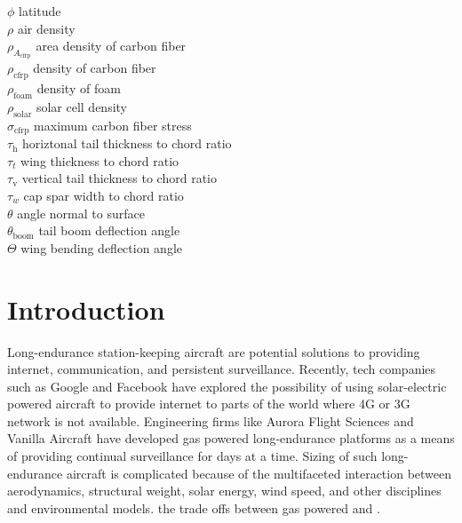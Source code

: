\begin{multicols}{2}
\begin{tabbing}
$\phi$ \> latitude \\
$\rho$ \> air density \\ %
$\rho_{A_{\text{cfrp}}}$ \> area density of carbon fiber \\ %
$\rho_{\text{cfrp}}$ \> density of carbon fiber \\ %
$\rho_{\text{foam}}$ \> density of foam \\ %
$\rho_{\text{solar}}$ \> solar cell density \\ %
$\sigma_{\text{cfrp}}$ \> maximum carbon fiber stress \\ %
$\tau_{\text{h}}$ \> horiztonal tail thickness to chord ratio \\
$\tau_t$ \> wing thickness to chord ratio \\
$\tau_{\text{v}}$ \> vertical tail thickness to chord ratio \\
$\tau_w$ \> cap spar width to chord ratio \\
$\theta$ \> angle normal to surface \\
$\theta_{\text{boom}}$ \> tail boom deflection angle \\
$\Theta$ \> wing bending deflection angle 
 \end{tabbing}

\end{multicols}

\section{Introduction}

Long-endurance station-keeping aircraft are potential solutions to providing internet, communication, and persistent surveillance. 
Recently, tech companies such as Google\cite{googletitan} and Facebook\cite{aquila} have explored the possibility of using solar-electric powered aircraft to provide internet to parts of the world where 4G or 3G network is not available. 
Engineering firms like Aurora Flight Sciences\cite{orion} and Vanilla Aircraft\cite{vanilla} have developed gas powered long-endurance platforms as a means of providing continual surveillance for days at a time.  
Sizing of such long-endurance aircraft is complicated because of the multifaceted interaction between aerodynamics, structural weight, solar energy, wind speed, and other disciplines and environmental models.
\DIFdelbegin {}\DIFdelend \DIFaddbegin {}\DIFaddend the trade offs between gas powered and \DIFdelbegin {}\DIFdelend \DIFaddbegin {}\DIFaddend . 

